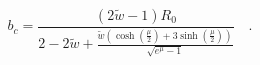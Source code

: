 \begin{equation}
b_c=\frac{(2\tilde{w}-1)R_0}{2-2\tilde{w}+\frac{\tilde{w}\left(\cosh\left(\frac{\mu}{2}\right)+3\sinh\left(\frac{\mu}{2}\right)\right)}{\sqrt{e^{\mu}-1}}}\quad.
\end{equation}

